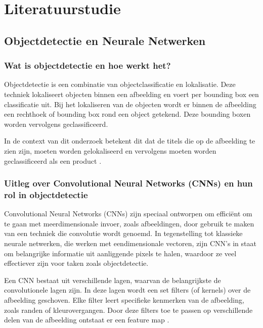 
\section{Literatuurstudie}%
\label{sec:literatuurstudie}

\subsection{Objectdetectie en Neurale Netwerken}

\subsubsection{Wat is objectdetectie en hoe werkt het?}
Objectdetectie is een combinatie van objectclassificatie en lokalisatie. Deze techniek lokaliseert objecten binnen een afbeelding en voert per bounding box een classificatie uit. Bij het lokaliseren van de objecten wordt er binnen de afbeelding een rechthoek of bounding box rond een object getekend. Deze bounding boxen worden vervolgens geclassificeerd.

In de context van dit onderzoek betekent dit dat de titels die op de afbeelding te zien zijn, moeten worden gelokaliseerd en vervolgens moeten worden geclassificeerd als een product \autocite{wulteputteefficient}.

\subsubsection{Uitleg over Convolutional Neural Networks (CNNs) en hun rol in objectdetectie}
Convolutional Neural Networks (CNNs) zijn speciaal ontworpen om efficiënt om te gaan met meerdimensionale invoer, zoals afbeeldingen, door gebruik te maken van een techniek die convolutie wordt genoemd. In tegenstelling tot klassieke neurale netwerken, die werken met eendimensionale vectoren, zijn CNN's in staat om belangrijke informatie uit aanliggende pixels te halen, waardoor ze veel effectiever zijn voor taken zoals objectdetectie.

Een CNN bestaat uit verschillende lagen, waarvan de belangrijkste de convolutionele lagen zijn. In deze lagen wordt een set filters (of kernels) over de afbeelding geschoven. Elke filter leert specifieke kenmerken van de afbeelding, zoals randen of kleurovergangen. Door deze filters toe te passen op verschillende delen van de afbeelding ontstaat er een feature map \autocite{wulteputteefficient}. 

